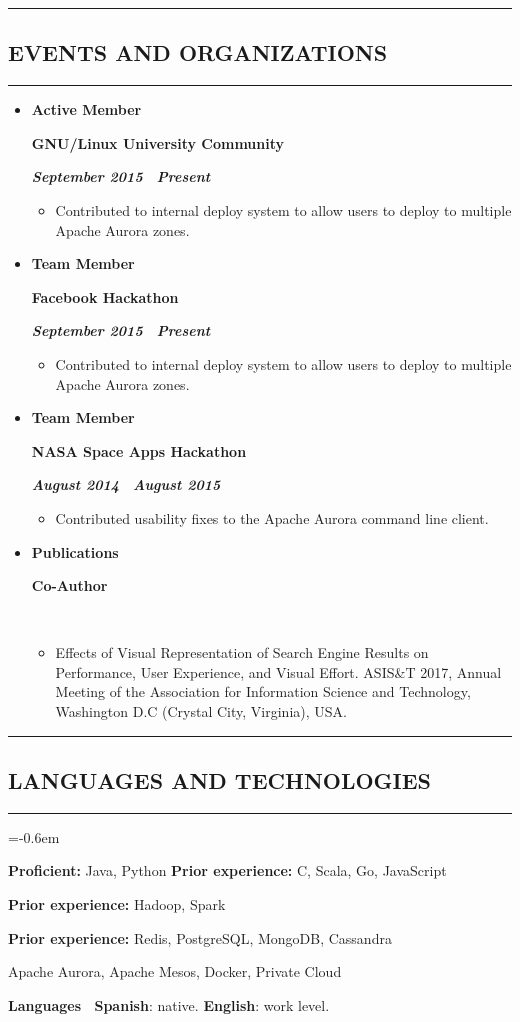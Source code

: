 \documentclass[10pt,letterpaper]{article}
\newcommand{\textbox}[1]{
  \parbox{.333\textwidth}{#1}
}
\newcommand{\CPP}
{C\nolinebreak[4]\hspace{-.05em}\raisebox{.22ex}{\footnotesize\bf ++}}
\newcommand{\sectionTitle}[1]{
  \hrule
  \vspace{-1.0em} 
  \subsection*{\uppercase{\textbf{#1}}}
  \vspace{-0.3em}
    \hrule
    \vspace{0.5em}  
}
\newcommand{\languageSection}[4]{
  \vspace{-0.5em}
  \begin{center}
    \textbf{Languages \textendash \ }\textbf{#1}: #2. \textbf{#3}: #4.
  \end{center}
}
\newcommand{\titleExperienceWithoutLocation}[4]{
  \vspace{1.0em}
  \item[]
  {
    \textbox{\textbf{#1}\hfill}\textbox{\hfil \textbf{#2}\hfil}\hfill \textbf{\emph{#3 \textendash \ #4}}
  }
}
\begin{document}
  \sectionTitle{Events and Organizations}
  \begin{itemize}[leftmargin=*]
    \parskip=-0.6em 
    \titleExperienceWithoutLocation{Active Member}{GNU/Linux University Community}{September 2015}{Present}
      \begin{itemize}[label=\textbullet]
        \itemsep0em
        \item Contributed to internal deploy system to allow users to deploy to multiple Apache Aurora zones.
      \end{itemize}
  
    \titleExperienceWithoutLocation{Team Member}{Facebook Hackathon}{September 2015}{Present}
      \begin{itemize}[label=\textbullet]
        \itemsep0em
        \item Contributed to internal deploy system to allow users to deploy to multiple Apache Aurora zones.
      \end{itemize}
  
    \titleExperienceWithoutLocation{Team Member}{NASA Space Apps Hackathon}{August 2014}{August 2015}
      \begin{itemize}[label=\textbullet]
        \itemsep0em
        \item Contributed usability fixes to the Apache Aurora command line client.
      \end{itemize}

    \titleExperienceWithoutLocation{Publications}{Co-Author}{}{}
      \begin{itemize}[label=\textbullet]
        \itemsep0em
        \item Effects of Visual Representation of Search Engine Results on Performance, User Experience, and Visual Effort. ASIS\&T 2017,  Annual Meeting of the Association for Information Science and Technology, Washington D.C (Crystal City, Virginia), USA.
      \end{itemize}
    \end{itemize} 
  
  \sectionTitle{Languages and Technologies}
  \vspace{0.5em}
  \begin{description}[labelindent=\parindent]
    \parskip=-0.6em
    \item [Languages:] \textbf{Proficient:} Java, Python \textbf{Prior experience:} \CPP, Scala, Go, JavaScript
    \item [Frameworks:] \textbf{Prior experience:} Hadoop, Spark
    \item [Databases:] \textbf{Prior experience:} Redis, PostgreSQL, MongoDB, Cassandra
    \item [Systems:] Apache Aurora, Apache Mesos, Docker, Private Cloud
  \end{description}
  
  \languageSection{Spanish}{native}{English}{work level}
  
\end{document}
